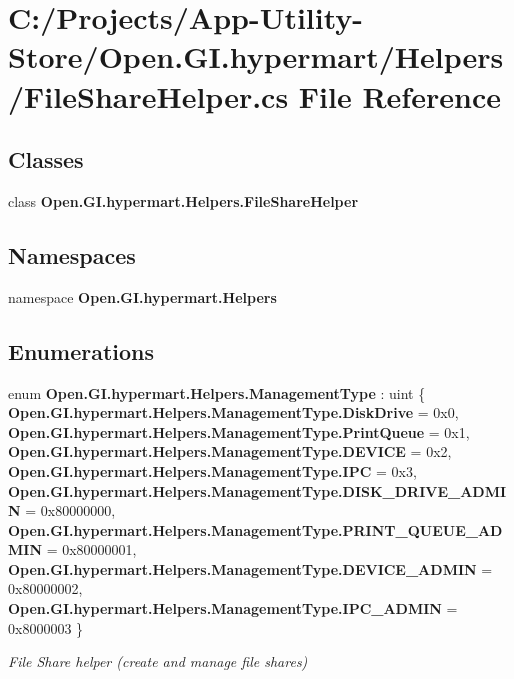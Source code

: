 \section{C\+:/\+Projects/\+App-\/\+Utility-\/\+Store/\+Open.G\+I.\+hypermart/\+Helpers/\+File\+Share\+Helper.cs File Reference}
\label{_file_share_helper_8cs}
\subsection*{Classes}
\begin{DoxyCompactItemize}
\item 
class \textbf{ Open.\+G\+I.\+hypermart.\+Helpers.\+File\+Share\+Helper}
\end{DoxyCompactItemize}
\subsection*{Namespaces}
\begin{DoxyCompactItemize}
\item 
namespace \textbf{ Open.\+G\+I.\+hypermart.\+Helpers}
\end{DoxyCompactItemize}
\subsection*{Enumerations}
\begin{DoxyCompactItemize}
\item 
enum \textbf{ Open.\+G\+I.\+hypermart.\+Helpers.\+Management\+Type} \+: uint \{ \newline
\textbf{ Open.\+G\+I.\+hypermart.\+Helpers.\+Management\+Type.\+Disk\+Drive} = 0x0, 
\textbf{ Open.\+G\+I.\+hypermart.\+Helpers.\+Management\+Type.\+Print\+Queue} = 0x1, 
\textbf{ Open.\+G\+I.\+hypermart.\+Helpers.\+Management\+Type.\+D\+E\+V\+I\+CE} = 0x2, 
\textbf{ Open.\+G\+I.\+hypermart.\+Helpers.\+Management\+Type.\+I\+PC} = 0x3, 
\newline
\textbf{ Open.\+G\+I.\+hypermart.\+Helpers.\+Management\+Type.\+D\+I\+S\+K\+\_\+\+D\+R\+I\+V\+E\+\_\+\+A\+D\+M\+IN} = 0x80000000, 
\textbf{ Open.\+G\+I.\+hypermart.\+Helpers.\+Management\+Type.\+P\+R\+I\+N\+T\+\_\+\+Q\+U\+E\+U\+E\+\_\+\+A\+D\+M\+IN} = 0x80000001, 
\textbf{ Open.\+G\+I.\+hypermart.\+Helpers.\+Management\+Type.\+D\+E\+V\+I\+C\+E\+\_\+\+A\+D\+M\+IN} = 0x80000002, 
\textbf{ Open.\+G\+I.\+hypermart.\+Helpers.\+Management\+Type.\+I\+P\+C\+\_\+\+A\+D\+M\+IN} = 0x8000003
 \}\begin{DoxyCompactList}\small\item\em File Share helper (create and manage file shares) \end{DoxyCompactList}
\end{DoxyCompactItemize}
